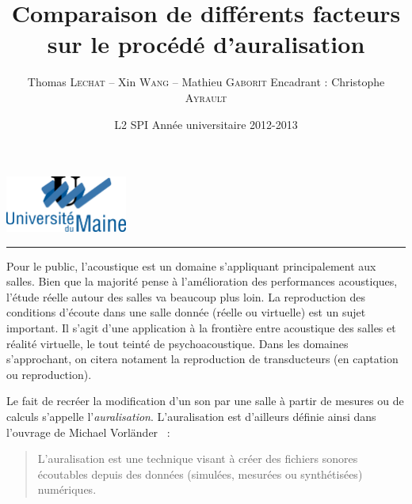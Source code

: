 \documentclass[a4paper, 11pt]{report}
\title{Comparaison de différents facteurs sur le procédé d'auralisation}
\author{Thomas \textsc{Lechat} -- Xin \textsc{Wang} -- Mathieu \textsc{Gaborit} \hfill Encadrant : Christophe
    \textsc{Ayrault}}
\date{L2 SPI
    \vskip 1cm
    Année universitaire 2012-2013}
\makeatletter
\def\thetitle{\@title}
\def\theauthor{\@author}
\def\thedate{\@date}
\makeatother
\begin{document}
\begin{titlepage}

\begin{flushright}
\includegraphics[width=4cm]{logo.png}
\end{flushright}


\vskip 6cm


\vfill

\begin{center}
\Large{
\thedate
}
\end{center}

\vskip 1cm
\hrule height .5pt
\vskip 1cm

\begin{flushleft}
\theauthor
\end{flushleft}

\end{titlepage}
\renewcommand{\contentsname}{Sommaire
\vskip .5cm
\hrule height .5pt}
\tableofcontents
\newpage

Pour le public, l'acoustique est un domaine s'appliquant principalement aux salles.
Bien que la majorité pense à l'amélioration des performances acoustiques, l'étude réelle autour des salles va
beaucoup plus loin.
La reproduction des conditions d'écoute dans une salle donnée (réelle ou virtuelle) est un sujet important. Il s'agit d'une
application à la frontière entre acoustique des salles et réalité virtuelle, le tout teinté de psychoacoustique. Dans les
domaines s'approchant, on citera notament la reproduction de transducteurs (en captation ou reproduction).

\medskip

Le fait de recréer la modification d'un son par une salle à partir de mesures ou de calculs s'appelle
l'\emph{auralisation}. L'auralisation est d'ailleurs définie ainsi dans l'ouvrage de Michael
Vorländer~ :

\begin{quote}
L'auralisation est une technique visant à créer des fichiers sonores écoutables depuis des données (simulées, mesurées
ou synthétisées) numériques.
\end{quote}
\end{document}
